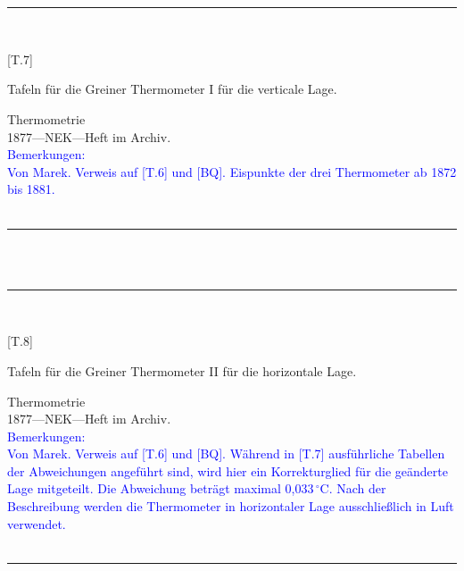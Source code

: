 \\
\vspace*{-2.5pt}\\
\parbox{\textwidth}{%
\rule{\textwidth}{1pt}\vspace*{-3mm}\\
\begin{minipage}[t]{0.2\textwidth}\vspace{0pt}
\Huge\rule[-4mm]{0cm}{1cm}[T.7]
\end{minipage}
\hfill
\begin{minipage}[t]{0.8\textwidth}\vspace{0pt}
\large Tafeln für die Greiner Thermometer I für die verticale Lage.\rule[-2mm]{0mm}{2mm}
\end{minipage}
{\footnotesize\flushright
Thermometrie\\
}
1877\quad---\quad NEK\quad---\quad Heft im Archiv.\\
\textcolor{blue}{Bemerkungen:\\{}
Von Marek. Verweis auf [T.6] und [BQ]. Eispunkte der drei Thermometer ab 1872 bis 1881.\\{}
}
\\[-15pt]
\rule{\textwidth}{1pt}
}
\\
\vspace*{-2.5pt}\\
\parbox{\textwidth}{%
\rule{\textwidth}{1pt}\vspace*{-3mm}\\
\begin{minipage}[t]{0.2\textwidth}\vspace{0pt}
\Huge\rule[-4mm]{0cm}{1cm}[T.8]
\end{minipage}
\hfill
\begin{minipage}[t]{0.8\textwidth}\vspace{0pt}
\large Tafeln für die Greiner Thermometer II für die horizontale Lage.\rule[-2mm]{0mm}{2mm}
\end{minipage}
{\footnotesize\flushright
Thermometrie\\
}
1877\quad---\quad NEK\quad---\quad Heft im Archiv.\\
\textcolor{blue}{Bemerkungen:\\{}
Von Marek. Verweis auf [T.6] und [BQ]. Während in [T.7] ausführliche Tabellen der Abweichungen angeführt sind, wird hier ein Korrekturglied für die geänderte Lage mitgeteilt. Die Abweichung beträgt maximal 0,033\,{$^\circ$}C. Nach der Beschreibung werden die Thermometer in horizontaler Lage ausschließlich in Luft verwendet.\\{}
}
\\[-15pt]
\rule{\textwidth}{1pt}
}
